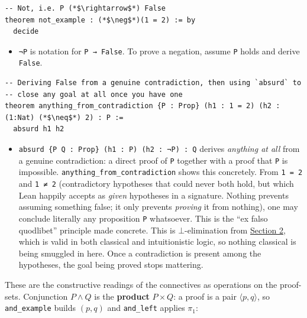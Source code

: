 \begin{lstlisting}
-- Not, i.e. P (*$\rightarrow$*) False
theorem not_example : (*$\neg$*)(1 = 2) := by
  decide
\end{lstlisting}

\begin{itemize}
\tightlist
\item
  \texttt{¬P} is notation for \texttt{P → False}. To prove a negation, assume \texttt{P} holds and derive \texttt{False}.
\end{itemize}

\begin{lstlisting}
-- Deriving False from a genuine contradiction, then using `absurd` to
-- close any goal at all once you have one
theorem anything_from_contradiction {P : Prop} (h1 : 1 = 2) (h2 : (1:Nat) (*$\neq$*) 2) : P :=
  absurd h1 h2
\end{lstlisting}

\begin{itemize}
\tightlist
\item
  \texttt{absurd \{P Q : Prop\} (h1 : P) (h2 : ¬P) : Q} derives \emph{anything at all} from a genuine contradiction: a direct proof of \texttt{P} together with a proof that \texttt{P} is impossible. \texttt{anything\_\allowbreak{}from\_\allowbreak{}contradiction} shows this concretely. From \texttt{1 = 2} and \texttt{1 ≠ 2} (contradictory hypotheses that could never both hold, but which Lean happily accepts as \emph{given} hypotheses in a signature. Nothing prevents assuming something false; it only prevents \emph{proving} it from nothing), one may conclude literally any proposition \texttt{P} whatsoever. This is the ``ex falso quodlibet'' principle made concrete. This is \(\bot\)-elimination from \hyperref[sec:03-propositions-and-proofs:02-logic-recap:1]{Section 2}, which is valid in both classical and intuitionistic logic, so nothing classical is being smuggled in here. Once a contradiction is present among the hypotheses, the goal being proved stops mattering.
\end{itemize}

\begin{mathreading}

These are the constructive readings of the connectives as operations on the proof-sets. Conjunction \(P \wedge Q\) is the \textbf{product} \(P \times Q\): a proof is a pair \(\langle p, q\rangle\), so \texttt{and\_\allowbreak{}example} builds \((p,q)\) and \texttt{and\_\allowbreak{}left} applies \(\pi_1\):

\end{mathreading}

